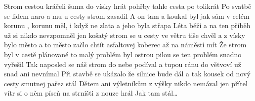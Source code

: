 \begin{TEXT}{Strom}
\SLOKA {} cestou kráčeli šuma do vísky hrát \NL
{} pohřby tahle cesta po tolikrát \NL
Po  svatbě se  lidem  naro \NL
a  mu u  cesty  strom zasadil 
\REFREN  A on tam  a koukal  \NL
byl jak  sám v celém  \NL
korunu , korunu měl, i když ne  zlata  \NL
a jeho  byla  střapa 
\SLOKA Léta běží a na ten příběh už si nikdo nevzpomněl \NL
jen košatý strom se u cesty ve větru tiše chvěl \NL
a z vísky bylo město a to město začlo chtít \NL
asfaltovej koberec až na náměstí mít 
\SLOKA Že strom byl v cestě plánované to malý problém byl \NL
ostrou pilou se ten problém snadno vyřešil \NL
Tak naposled se náš strom do nebe podíval \NL
a tupou ránu do větvoví už snad ani nevnímal 
\SLOKA Při stavbě se ukázalo že silnice bude dál \NL
a tak kousek od nový cesty smutnej pařez stál \NL
Dětem ani výletníkům z výšky nikdo nemával \NL
jen přítel vítr si o něm píseň na strništi z nouze hrál 
\REFREN  Jak tam stál… \NL
\end{TEXT}
